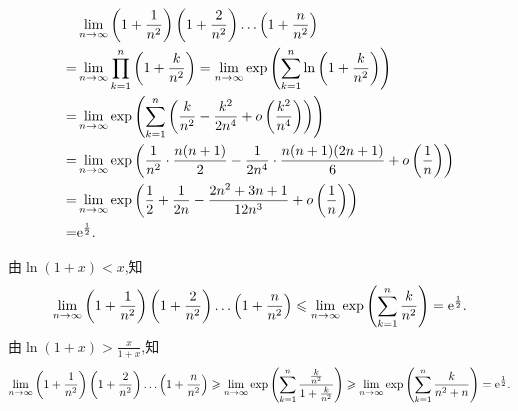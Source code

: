 \begin{solution}
    \begin{align*}
        & \lim_{n \to \infty} \left(1 + \frac{1}{n^2}\right) \left(1 + \frac{2}{n^2}\right) \dots \left(1 + \frac{n}{n^2}\right) \\
     = &\lim_{n \to \infty} \prod_{k=1}^n \left(1 + \frac{k}{n^2}\right) = \lim_{n \to \infty} \exp\left(\sum_{k=1}^n \ln\left(1 + \frac{k}{n^2}\right)\right)          \\
                                                                                                                                                =& \lim_{n \to \infty} \exp\left(\sum_{k=1}^n \left(\frac{k}{n^2} - \frac{k^2}{2 n^4} + o\left(\frac{k^2}{n^4}\right)\right)\right)                                   \\
                                                                                                                                                 =& \lim_{n \to \infty} \exp\left(\frac{1}{n^2} \cdot \frac{n(n+1)}{2} - \frac{1}{2 n^4} \cdot \frac{n(n+1)(2n+1)}{6} + o\left(\frac{1}{n}\right)\right)        \\
                                                                                                                                                =& \lim_{n \to \infty} \exp\left(\frac{1}{2} + \frac{1}{2 n} - \frac{2 n^2 + 3 n + 1}{12 n^3} + o\left(\frac{1}{n}\right)\right)                             \\
                                                                                                                                                =& \mathrm{e}^{\frac{1}{2}}.
    \end{align*}
\end{solution}

\begin{solution}[另解]
    由$\ln(1+x) < x$,知
    $$\lim_{n \to \infty} \left(1 + \frac{1}{n^2}\right) \left(1 + \frac{2}{n^2}\right) \dots \left(1 + \frac{n}{n^2}\right) \leqslant \lim_{n \to \infty} \exp\left(\sum_{k=1}^n \frac{k}{n^2}\right) = \mathrm{e}^{\frac{1}{2}}.$$
    由$\ln(1+x) > \frac{x}{1+x}$,知
    $$\lim_{n \to \infty} \left(1 + \frac{1}{n^2}\right) \left(1 + \frac{2}{n^2}\right) \dots \left(1 + \frac{n}{n^2}\right) \geqslant \lim_{n \to \infty} \exp\left(\sum_{k=1}^n \frac{\frac{k}{n^2}}{1 + \frac{k}{n^2}}\right) \geqslant \lim_{n \to \infty} \exp\left(\sum_{k=1}^n \frac{k}{n^2 + n}\right) = \mathrm{e}^{\frac{1}{2}}.$$
\end{solution}

